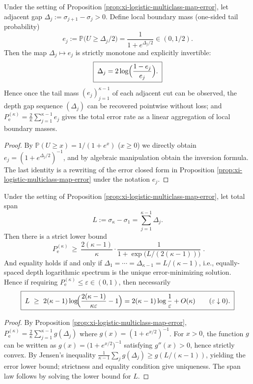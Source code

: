 \begin{corollary}\label{cor:xi-logistic-boundary-mass-inverts-spacing}
Under the setting of Proposition \ref{prop:xi-logistic-multiclass-map-error}, let adjacent gap \(\Delta_j:=\sigma_{j+1}-\sigma_j>0\).
Define local boundary mass (one-sided tail probability)
\[
e_j:=\mathbb P\bigl(U\ge \Delta_j/2\bigr)=\frac{1}{1+e^{\Delta_j/2}}\in(0,1/2).
\]
Then the map \(\Delta_j\mapsto e_j\) is strictly monotone and explicitly invertible:
\[
\boxed{\;
\Delta_j=2\log\Bigl(\frac{1-e_j}{e_j}\Bigr).\;}
\]
Hence once the tail mass \((e_j)_{j=1}^{\kappa-1}\) of each adjacent cut can be observed, the depth gap sequence \((\Delta_j)\) can be recovered pointwise without loss; and
\(
P_{\mathrm e}^{(\kappa)}=\frac{2}{\kappa}\sum_{j=1}^{\kappa-1}e_j
\)
gives the total error rate as a linear aggregation of local boundary masses.
\end{corollary}
\begin{proof}
By \(\mathbb P(U\ge x)=1/(1+e^{x})\) (\(x\ge 0\)) we directly obtain \(e_j=(1+e^{\Delta_j/2})^{-1}\), and by algebraic manipulation obtain the inversion formula.
The last identity is a rewriting of the error closed form in Proposition \ref{prop:xi-logistic-multiclass-map-error} under the notation \(e_j\).
\end{proof}

\begin{corollary}\label{cor:xi-logistic-optimal-spacing-span-law}
Under the setting of Proposition \ref{prop:xi-logistic-multiclass-map-error}, let total span
\[
L:=\sigma_\kappa-\sigma_1=\sum_{j=1}^{\kappa-1}\Delta_j.
\]
Then there is a strict lower bound
\[
\boxed{\;
P_{\mathrm e}^{(\kappa)}
\ \ge\
\frac{2(\kappa-1)}{\kappa}\cdot\frac{1}{1+\exp\!\bigl(L/(2(\kappa-1))\bigr)}\; }.
\]
And equality holds if and only if
\(
\Delta_1=\cdots=\Delta_{\kappa-1}=L/(\kappa-1)
\), i.e., equally-spaced depth logarithmic spectrum is the unique error-minimizing solution.
Hence if requiring \(P_{\mathrm e}^{(\kappa)}\le \varepsilon\in(0,1)\), then necessarily
\[
\boxed{\;
L\ \ge\ 2(\kappa-1)\log\!\Bigl(\frac{2(\kappa-1)}{\kappa\varepsilon}-1\Bigr)
=2(\kappa-1)\log\frac{1}{\varepsilon}+O(\kappa)\qquad(\varepsilon\downarrow0).\;}
\]
\end{corollary}
\begin{proof}
By Proposition \ref{prop:xi-logistic-multiclass-map-error},
\(
P_{\mathrm e}^{(\kappa)}=\frac{2}{\kappa}\sum_{j=1}^{\kappa-1}g(\Delta_j)
\)
where \(g(x)=(1+e^{x/2})^{-1}\).
For \(x>0\), the function \(g\) can be written as \(g(x)=\bigl(1+e^{x/2}\bigr)^{-1}\) satisfying \(g''(x)>0\), hence strictly convex.
By Jensen's inequality
\(
\frac{1}{\kappa-1}\sum_{j}g(\Delta_j)\ge g(L/(\kappa-1))
\),
yielding the error lower bound; strictness and equality condition give uniqueness.
The span law follows by solving the lower bound for \(L\).
\end{proof}

